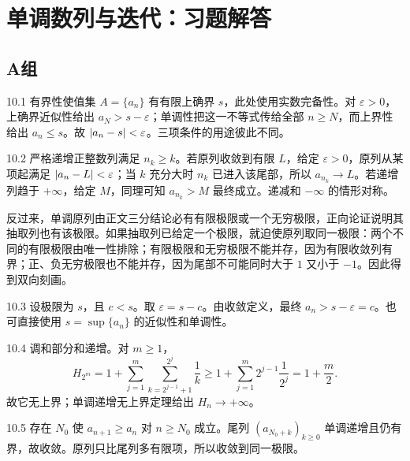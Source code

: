 \chapter{单调数列与迭代：习题解答}

\section*{A组}

\begin{solution}{10.1}
有界性使值集 \(A=\{a_n\}\) 有有限上确界 \(s\)，此处使用实数完备性。对 \(\varepsilon>0\)，上确界近似性给出 \(a_N>s-\varepsilon\)；单调性把这一不等式传给全部 \(n\ge N\)，而上界性给出 \(a_n\le s\)。故
\(\left|a_n-s\right|<\varepsilon\)。三项条件的用途彼此不同。
\end{solution}

\begin{solution}{10.2}
严格递增正整数列满足 \(n_k\ge k\)。若原列收敛到有限
\(L\)，给定 \(\varepsilon>0\)，原列从某项起满足
\(\left|a_n-L\right|<\varepsilon\)；当 \(k\) 充分大时 \(n_k\) 已进入该尾部，所以 \(a_{n_k}\to L\)。若递增列趋于 \(+\infty\)，给定
\(M\)，同理可知 \(a_{n_k}>M\) 最终成立。递减和
\(-\infty\) 的情形对称。

反过来，单调原列由正文三分结论必有有限极限或一个无穷极限，正向论证说明其抽取列也有该极限。如果抽取列已给定一个极限，就迫使原列取同一极限：两个不同的有限极限由唯一性排除；有限极限和无穷极限不能并存，因为有限收敛列有界；正、负无穷极限也不能并存，因为尾部不可能同时大于 \(1\) 又小于 \(-1\)。因此得到双向刻画。
\end{solution}

\begin{solution}{10.3}
设极限为 \(s\)，且 \(c<s\)。取 \(\varepsilon=s-c\)。由收敛定义，最终
\(a_n>s-\varepsilon=c\)。也可直接使用 \(s=\sup\{a_n\}\) 的近似性和单调性。
\end{solution}

\begin{solution}{10.4}
调和部分和递增。对 \(m\ge1\)，
\[
 H_{2^m}
 =1+\sum_{j=1}^m\sum_{k=2^{j-1}+1}^{2^j}\frac1k
 \ge1+\sum_{j=1}^m2^{j-1}\frac1{2^j}
 =1+\frac m2.
\]
故它无上界；单调递增无上界定理给出 \(H_n\to+\infty\)。
\end{solution}

\begin{solution}{10.5}
存在 \(N_0\) 使 \(a_{n+1}\ge a_n\) 对 \(n\ge N_0\) 成立。尾列 \((a_{N_0+k})_{k\ge0}\) 单调递增且仍有界，故收敛。原列只比尾列多有限项，所以收敛到同一极限。
\end{solution}

